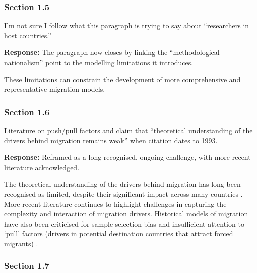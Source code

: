 \documentclass[11pt,a4paper]{article}
\begin{document}
\subsubsection*{Section 1.5}

\begin{reviewbox}
I'm not sure I follow what this paragraph is trying to say about ``researchers in host countries.''
\end{reviewbox}

\textbf{Response:} The paragraph now closes by linking the ``methodological nationalism'' point to the modelling
limitations it introduces.

\vspace{0.3cm}
\begin{updatebox}
These limitations can constrain the development of more comprehensive and representative migration models.
\end{updatebox}

\subsubsection*{Section 1.6}

\begin{reviewbox}
Literature on push/pull factors and claim that ``theoretical understanding of the drivers behind migration remains weak'' when citation dates to 1993.
\end{reviewbox}

\textbf{Response:} Reframed as a long-recognised, ongoing challenge, with more recent literature acknowledged.

\vspace{0.3cm}
\begin{updatebox}
The theoretical understanding of the drivers behind migration has long been recognised as limited, despite their
significant impact across many countries \citep{227-massey1993theories}. More recent literature continues to highlight
challenges in capturing the complexity and interaction of migration drivers. Historical models of migration have also been
criticised for sample selection bias and insufficient attention to `pull' factors (drivers in potential destination
countries that attract forced migrants) \citep{145-davenport2003leave:}.
\end{updatebox}

\subsubsection*{Section 1.7}
\end{document}
